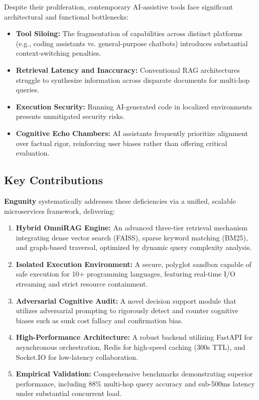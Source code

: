 \documentclass[conference]{IEEEtran}
\begin{document}
Despite their proliferation, contemporary AI-assistive tools face significant architectural and functional bottlenecks:
\begin{itemize}
    \item \textbf{Tool Siloing:} The fragmentation of capabilities across distinct platforms (e.g., coding assistants vs. general-purpose chatbots) introduces substantial context-switching penalties.
    \item \textbf{Retrieval Latency and Inaccuracy:} Conventional RAG architectures struggle to synthesize information across disparate documents for multi-hop queries.
    \item \textbf{Execution Security:} Running AI-generated code in localized environments presents unmitigated security risks.
    \item \textbf{Cognitive Echo Chambers:} AI assistants frequently prioritize alignment over factual rigor, reinforcing user biases rather than offering critical evaluation.
\end{itemize}

\subsection{Key Contributions}

\textbf{Engunity} systematically addresses these deficiencies via a unified, scalable microservices framework, delivering:

\begin{enumerate}
    \item \textbf{Hybrid OmniRAG Engine:} An advanced three-tier retrieval mechanism integrating dense vector search (FAISS), sparse keyword matching (BM25), and graph-based traversal, optimized by dynamic query complexity analysis.
    \item \textbf{Isolated Execution Environment:} A secure, polyglot sandbox capable of safe execution for 10+ programming languages, featuring real-time I/O streaming and strict resource containment.
    \item \textbf{Adversarial Cognitive Audit:} A novel decision support module that utilizes adversarial prompting to rigorously detect and counter cognitive biases such as sunk cost fallacy and confirmation bias.
    \item \textbf{High-Performance Architecture:} A robust backend utilizing FastAPI for asynchronous orchestration, Redis for high-speed caching (300s TTL), and Socket.IO for low-latency collaboration.
    \item \textbf{Empirical Validation:} Comprehensive benchmarks demonstrating superior performance, including 88\% multi-hop query accuracy and sub-500ms latency under substantial concurrent load.
\end{enumerate}
\end{document}

